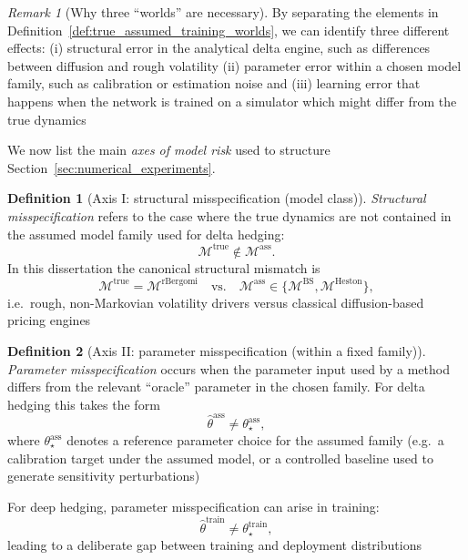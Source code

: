 \documentclass[12pt,a4paper]{article}
\theoremstyle{definition}
\newtheorem{definition}{Definition}[section]
\theoremstyle{plain}
\theoremstyle{remark}
\newtheorem{remark}{Remark}[section]
\theoremstyle{plain}
\begin{document}
\begin{remark}[Why three ``worlds'' are necessary]
\label{rem:three_worlds}
By separating the elements in Definition~\ref{def:true_assumed_training_worlds}, we can identify three different effects:
(i) structural error in the analytical delta engine, such as differences between diffusion and rough volatility \cite{GatheralRough,BayerFriz2016}
(ii) parameter error within a chosen model family, such as calibration or estimation noise \cite{ElKaroui1998Robustness} and
(iii) learning error that happens when the network is trained on a simulator which might differ from the true dynamics \cite{Buehler2019DeepHedging,Horvath2021DeepRough}
\end{remark}

\medskip

\noindent
We now list the main \emph{axes of model risk} used to structure Section~\ref{sec:numerical_experiments}.

\begin{definition}[Axis I: structural misspecification (model class)]
\label{def:axis_structural}
\emph{Structural misspecification} refers to the case where the true dynamics are not contained in the assumed model family used for delta hedging:
\[
\mathcal{M}^{\mathrm{true}} \notin \mathcal{M}^{\mathrm{ass}}.
\]
In this dissertation the canonical structural mismatch is
\[
\mathcal{M}^{\mathrm{true}}=\mathcal{M}^{\mathrm{rBergomi}
}\quad\text{vs.}\quad
\mathcal{M}^{\mathrm{ass}}\in\{\mathcal{M}^{\mathrm{BS}},\mathcal{M}^{\mathrm{Heston}}\},
\]
i.e.\ rough, non-Markovian volatility drivers versus classical diffusion-based pricing engines \cite{GatheralRough,BayerFriz2016,BlackScholes1973,Heston1993}
\end{definition}

\begin{definition}[Axis II: parameter misspecification (within a fixed family)]
\label{def:axis_parameter}
\emph{Parameter misspecification} occurs when the parameter input used by a method differs from the relevant ``oracle'' parameter in the chosen family.
For delta hedging this takes the form
\[
\hat\theta^{\mathrm{ass}} \neq \theta^{\mathrm{ass}}_{\star},
\]
where $\theta^{\mathrm{ass}}_{\star}$ denotes a reference parameter choice for the assumed family
(e.g.\ a calibration target under the assumed model, or a controlled baseline used to generate sensitivity perturbations) \cite{ElKaroui1998Robustness}

For deep hedging, parameter misspecification can arise in training:
\[
\hat\theta^{\mathrm{train}} \neq \theta^{\mathrm{train}}_{\star},
\]
leading to a deliberate gap between training and deployment distributions \cite{Buehler2019DeepHedging,Horvath2021DeepRough}
\end{definition}
\end{document}
